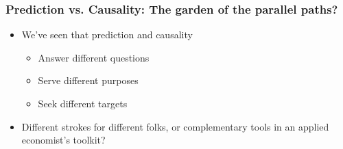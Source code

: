 \documentclass[
  shownotes,
  xcolor={svgnames},
  hyperref={colorlinks,citecolor=DarkBlue,linkcolor=andesred,urlcolor=DarkBlue}
  , aspectratio=169]{beamer}
\begin{document}
\begin{frame}
\frametitle{Prediction vs. Causality: The garden of the parallel paths?}

\begin{itemize}

\item We've seen that prediction and causality 
\medskip
  \begin{itemize}
    \item Answer different questions
    \medskip
    \item Serve different purposes
    \medskip
    \item Seek different targets
    \medskip
  \end{itemize}
\item Different strokes for different folks, or complementary tools in an applied economist's toolkit?
\end{itemize}

\end{frame}
\end{document}
